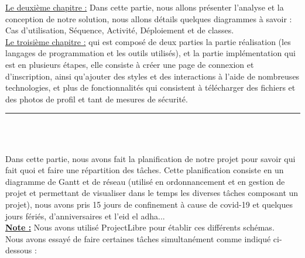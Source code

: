 \documentclass[12pt]{report}
\begin{document}
\uline{Le deuxième chapitre :} 
Dans cette partie, nous allons présenter l'analyse et la conception de notre solution, nous allons détails quelques diagrammes à savoir : Cas d'utilisation, Séquence, Activité,  Déploiement et de classes.
\\
\uline{Le troisième chapitre :} qui est composé de deux parties la partie réalisation (les langages de programmation et les outils utilisés), et la partie implémentation qui est en plusieurs étapes, elle consiste à créer une page de connexion et d'inscription, ainsi qu'ajouter des styles et des interactions à l'aide de nombreuses technologies, et plus de fonctionnalités qui consistent à télécharger des fichiers et des photos de profil et tant de mesures de sécurité.

\newpage

\vspace*{-0.2in}

\begin{center}
    {\color{Blue} \rule{6.2in}{1.4mm} }\\
    \vspace{0.1in}
    \scshape{\fontsize{34}{46}{\bfseries{\color{Blue}{Planification}}}}
    \\
    \vspace{0.12in}
\end{center}
\hspace*{-0.05in}
Dans cette partie, nous avons fait la planification de notre projet pour savoir qui fait quoi et faire une répartition des tâches. Cette planification consiste en un diagramme de Gantt et de réseau (utilisé en ordonnancement et en gestion de projet et permettant de visualiser dans le temps les diverses tâches composant un projet), nous avons pris 15 jours de confinement à cause de covid-19 et quelques jours fériés, d'anniversaires et l'eid el adha...
\\
\textbf{\underline{Note :}} Nous avons utilisé ProjectLibre pour établir ces différents schémas.
\\
Nous avons essayé de faire certaines tâches simultanément comme indiqué ci-dessous :

\vspace{0.15in}
\end{document}
